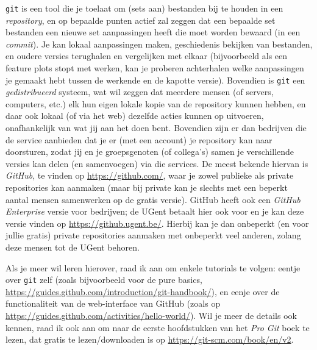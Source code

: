 \documentclass[a4paper,twoside,openany]{memoir}
\begin{document}
\verb!git! is een tool die je toelaat om (sets aan) bestanden bij te houden in
een \emph{repository}, en op bepaalde punten actief zal zeggen dat een bepaalde
set bestanden een nieuwe set aanpassingen heeft die moet worden bewaard (in een
\emph{commit}). Je kan lokaal aanpassingen maken, geschiedenis bekijken van
bestanden, en oudere versies terughalen en vergelijken met elkaar (bijvoorbeeld
als een feature plots stopt met werken, kan je proberen achterhalen welke
aanpassingen je gemaakt hebt tussen de werkende en de kapotte versie).
Bovendien is \verb!git! een \emph{gedistribueerd} systeem, wat wil zeggen dat
meerdere mensen (of servers, computers, etc.) elk hun eigen lokale kopie van de
repository kunnen hebben, en daar ook lokaal (of via het web) dezelfde acties
kunnen op uitvoeren, onafhankelijk van wat jij aan het doen bent. Bovendien
zijn er dan bedrijven die de service aanbieden dat je er (met een account) je
repository kan naar doorsturen, zodat jij en je groepsgenoten (of collega's)
samen je verschillende versies kan delen (en samenvoegen) via die services. De
meest bekende hiervan is \emph{GitHub}, te vinden op \url{https://github.com/},
waar je zowel publieke als private repositories kan aanmaken (maar bij private
kan je slechts met een beperkt aantal mensen samenwerken op de gratis versie).
GitHub heeft ook een \emph{GitHub Enterprise} versie voor bedrijven; de UGent
betaalt hier ook voor en je kan deze versie vinden op
\url{https://github.ugent.be/}. Hierbij kan je dan onbeperkt (en voor jullie
gratis) private repositories aanmaken met onbeperkt veel anderen, zolang deze
mensen tot de UGent behoren.

Als je meer wil leren hierover, raad ik aan om enkele tutorials te volgen:
eentje over \verb!git! zelf (zoals bijvoorbeeld voor de pure basics,
\url{https://guides.github.com/introduction/git-handbook/}), en eenje over de
functionaliteit van de web-interface van GitHub (zoals op
\url{https://guides.github.com/activities/hello-world/}). Wil je meer de
details ook kennen, raad ik ook aan om naar de eerste hoofdstukken van het
\emph{Pro Git} boek te lezen, dat gratis te lezen/downloaden is op
\url{https://git-scm.com/book/en/v2}.
\end{document}
